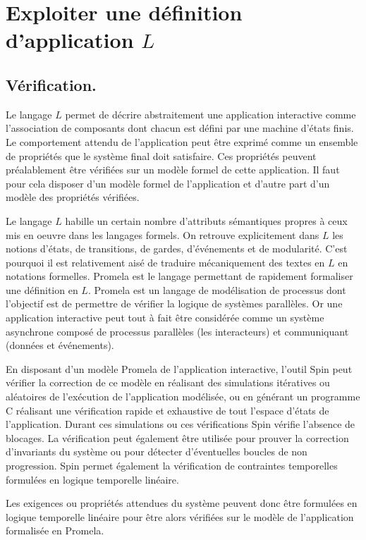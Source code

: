 \documentclass{ihm}
\begin{document}
\section{Exploiter une définition d'application $L$}
\label{sec:verif}

\subsection{Vérification.}
Le  langage  $L$  permet  de  décrire  abstraitement  une  application
interactive comme  l'association de composants dont  chacun est défini
par   une  machine   d'états   finis.  Le   comportement  attendu   de
l'application peut être exprimé comme un ensemble de propriétés que le
système final  doit satisfaire.  Ces propriétés  peuvent préalablement
être vérifiées sur un modèle formel de cette application. Il faut pour
cela disposer d'un modèle formel de l'application et d'autre part d'un
modèle des propriétés vérifiées.

Le  langage  $L$ habille  un  certain  nombre d'attributs  sémantiques
propres à ceux  mis en oeuvre dans les langages  formels.  On retrouve
explicitement dans $L$ les notions d'états, de transitions, de gardes,
d'événements et de modularité. C'est pourquoi il est relativement aisé
de traduire  mécaniquement des textes  en $L$ en  notations formelles.
Promela \cite{Spin} est le langage permettant de rapidement formaliser
une  définition en  $L$. Promela  est  un langage  de modélisation  de
processus dont l'objectif  est de permettre de vérifier  la logique de
systèmes parallèles. Or  une application interactive peut  tout à fait
être  considérée  comme un  système  asynchrone  composé de  processus
parallèles (les interacteurs) et communiquant (données et événements).

En disposant d'un modèle Promela de l'application interactive, l'outil
Spin  peut  vérifier la  correction  de  ce  modèle en  réalisant  des
simulations itératives  ou aléatoires de l'exécution  de l'application
modélisée, ou  en générant un  programme C réalisant  une vérification
rapide et exhaustive de tout l'espace d'états de l'application. Durant
ces  simulations  ou  ces  vérifications  Spin  vérifie  l'absence  de
blocages. La vérification peut également être utilisée pour prouver la
correction  d'invariants du  système  ou  pour détecter  d'éventuelles
boucles de non  progression. Spin permet également  la vérification de
contraintes temporelles formulées en logique temporelle linéaire. 

Les exigences  ou propriétés  attendues du  système peuvent  donc être
formulées en logique temporelle linéaire pour être alors vérifiées sur
le modèle de l'application formalisée en Promela.
\end{document}
